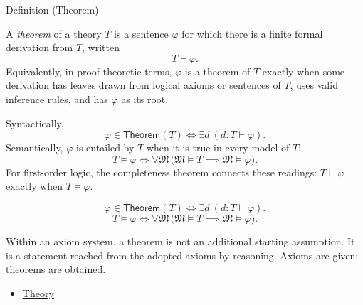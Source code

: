\begin{definitionbox}{Definition (Theorem)}
\begin{definition}[Theorem]
\label{def:axiom-systems-theorem}
A \emph{theorem} of a theory $T$ is a sentence $\varphi$ for which there is a
finite formal derivation from $T$, written
\[
  T\vdash\varphi.
\]
Equivalently, in proof-theoretic terms, $\varphi$ is a theorem of $T$ exactly
when some derivation has leaves drawn from logical axioms or sentences of
$T$, uses valid inference rules, and has $\varphi$ as its root.
\end{definition}
\end{definitionbox}
\begin{remark*}
Syntactically,
\[
  \varphi\in\mathsf{Theorem}(T)
  \iff \exists d\ (d:T\vdash\varphi).
\]
Semantically, $\varphi$ is entailed by $T$ when it is true in every model of
$T$:
\[
  T\vDash\varphi
  \iff
  \forall\mathfrak{M}\,
  \bigl(\mathfrak{M}\vDash T \implies \mathfrak{M}\vDash\varphi\bigr).
\]
For first-order logic, the completeness theorem connects these readings:
$T\vdash\varphi$ exactly when $T\vDash\varphi$.
\end{remark*}

\begin{remark*}
\[
\varphi\in\mathsf{Theorem}(T)
  \iff \exists d\ (d:T\vdash\varphi).
\]
\[
T\vDash\varphi
  \iff
  \forall\mathfrak{M}\,
  \bigl(\mathfrak{M}\vDash T \implies \mathfrak{M}\vDash\varphi\bigr).
\]
\end{remark*}




\begin{remark*}[Interpretation]
Within an axiom system, a theorem is not an additional starting assumption. It
is a statement reached from the adopted axioms by reasoning. Axioms are given;
theorems are obtained.
\end{remark*}

\begin{dependencies}
\begin{itemize}
  \item \hyperref[def:axiom-systems-theory]{Theory}
\end{itemize}
\end{dependencies}

